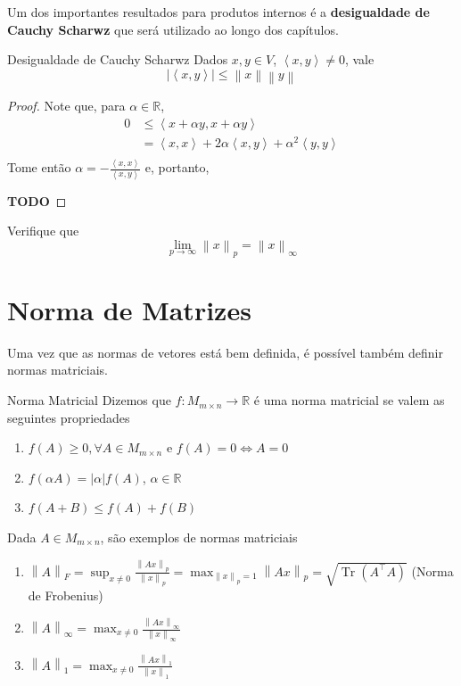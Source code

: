 \documentclass[12pt,openany]{book}
\newcommand{\R}{\mathbb{R}}
\newcommand{\norm}[1]{\left\lVert #1 \right\rVert}
\newcommand{\abs}[1]{\left\lvert #1 \right\rvert}
\newcommand{\inner}[2]{\left\langle #1, #2 \right\rangle}
\DeclareMathOperator{\tr}{Tr}
\begin{document}
Um dos importantes resultados para produtos internos é a \textbf{desigualdade de Cauchy Scharwz} que será utilizado ao longo dos capítulos.

\begin{theorem}{Desigualdade de Cauchy Scharwz}{}
    Dados $x, y \in V$, $\inner{x}{y} \not= 0$, vale
    \[
        \abs{\inner{x}{y}} \leq \norm{x}\norm{y}
    \]
\end{theorem}

\begin{proof}
    Note que, para $\alpha \in \R$,
    \[
        \begin{aligned}
            0 &\leq \inner{x + \alpha y}{x + \alpha y} \\
            &= \inner{x}{x} + 2\alpha\inner{x}{y} + \alpha^2\inner{y}{y} \\
        \end{aligned}
    \]
    Tome então $\alpha = -\frac{\inner{x}{x}}{\inner{x}{y}}$ e, portanto,
    
    \textbf{TODO}
\end{proof}

\begin{exercise}{}{}
    Verifique que
    \[
        \lim_{p \to \infty} \norm{x}_p = \norm{x}_\infty
    \]
\end{exercise}

\section{Norma de Matrizes}
Uma vez que as normas de vetores está bem definida, é possível também definir normas matriciais.

\begin{definition}{Norma Matricial}{}
    Dizemos que $f \colon M_{m \times n} \to \R$ é uma norma matricial se valem as seguintes propriedades
    \begin{enumerate}[label=\roman*)]
        \item $f(A) \geq 0, \forall A \in M_{m \times n}$ e $f(A) = 0 \iff A = 0$
        \item $f(\alpha A) = \abs{\alpha}f(A)$, $\alpha \in \R$
        \item $f(A + B) \leq f(A) + f(B)$
    \end{enumerate}
\end{definition}

Dada $A \in M_{m \times n}$, são exemplos de normas matriciais
\begin{enumerate}[label=\arabic*)]
    \item $\norm{A}_F = \sup_{x \not= 0} \frac{\norm{Ax}_p}{\norm{x}_p} = \max_{\norm{x}_p = 1} \norm{Ax}_p = \sqrt{\tr(A^\top A)}$ (Norma de Frobenius)
    \item $\norm{A}_\infty = \max_{x \not= 0} \frac{\norm{Ax}_\infty}{\norm{x}_\infty}$
    \item $\norm{A}_1 = \max_{x \not= 0} \frac{\norm{Ax}_1}{\norm{x}_1}$
\end{enumerate}
\end{document}
